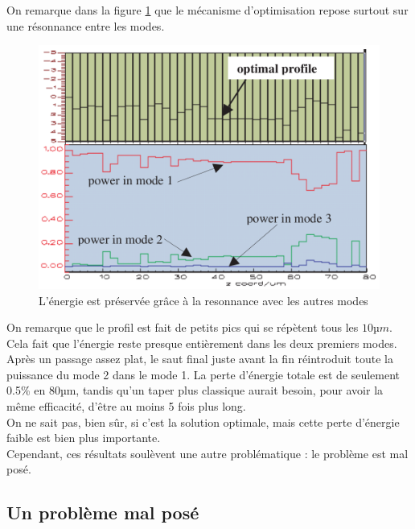 \documentclass{article}
\begin{document}
On remarque dans la figure \ref{fig:powMode} que le mécanisme d'optimisation repose surtout sur une résonnance entre les modes.
\begin{figure}[!h]
	\centering
	\includegraphics[scale=0.25]{images/powMode.png}
	\caption{L'énergie est préservée grâce à la resonnance avec les autres modes}
	\label{fig:powMode}
\end{figure}
On remarque que le profil est fait de petits pics qui se répètent tous les $10µm$. Cela fait que l'énergie reste presque entièrement dans les deux premiers modes. Après un passage assez plat, le saut final juste avant la fin réintroduit toute la puissance du mode 2 dans le mode 1. La perte d'énergie totale est de seulement 0.5\% en 80µm, tandis qu'un taper plus classique aurait besoin, pour avoir la même efficacité, d'être au moins 5 fois plus long.\\
On ne sait pas, bien sûr, si c'est la solution optimale, mais cette perte d'énergie faible est bien plus importante.\\
Cependant, ces résultats soulèvent une autre problématique : le problème est mal posé.

\subsection{Un problème mal posé}



\end{document}
